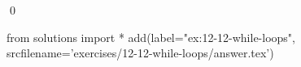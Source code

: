 
\begin{ex}
  \label{ex:12-12-while-loops}
  
  \qed
\end{ex}
\begin{python0}
from solutions import *
add(label="ex:12-12-while-loops",
    srcfilename='exercises/12-12-while-loops/answer.tex')
\end{python0}

